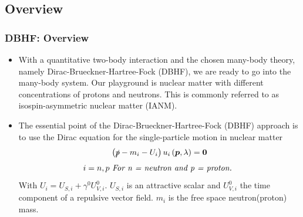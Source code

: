\documentclass[10pt,serif]{beamer}
\newcommand{\bvec}[1]{\boldsymbol{#1}}
\newcommand{\rb}[1]{\left(#1\right)}
\begin{document}
\subsection{Overview}
\begin{frame}
\frametitle{DBHF: Overview}
\begin{itemize}
\item With a quantitative two-body interaction and the chosen many-body theory, namely Dirac-Brueckner-Hartree-Fock (DBHF), we are ready to go into the many-body system. Our playground is \alert{nuclear matter} with different concentrations of protons and neutrons. This is commonly referred to as \alert{isospin-asymmetric nuclear matter (IANM)}.
\item The essential point of the Dirac-Brueckner-Hartree-Fock (DBHF) approach is to use the Dirac equation for the single-particle motion in nuclear matter
\begin{equation}
\rb{ \slashed{p} - m_i - U_i } u_i \rb{\bvec{p},\lambda} = \bvec{0}
\end{equation}
\begin{equation}
i=n,p \text{   \emph{For n = neutron and p = proton.} }
\end{equation}
With $U_i=U_{S,i}+\gamma^0 U^0_{V,i}$. $U_{S,i}$ is an attractive scalar and $U^0_{V,i}$ the time component of a repulsive vector field. $m_i$ is the free space neutron(proton) mass.
\end{itemize}
\end{frame}
\end{document}
